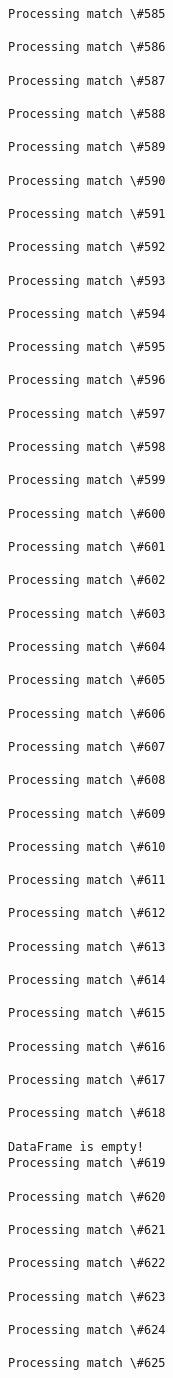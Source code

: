 \documentclass[11pt]{article}
\begin{document}
\begin{Verbatim}[commandchars=\\\{\}]
Processing match \#585

Processing match \#586

Processing match \#587

Processing match \#588

Processing match \#589

Processing match \#590

Processing match \#591

Processing match \#592

Processing match \#593

Processing match \#594

Processing match \#595

Processing match \#596

Processing match \#597

Processing match \#598

Processing match \#599

Processing match \#600

Processing match \#601

Processing match \#602

Processing match \#603

Processing match \#604

Processing match \#605

Processing match \#606

Processing match \#607

Processing match \#608

Processing match \#609

Processing match \#610

Processing match \#611

Processing match \#612

Processing match \#613

Processing match \#614

Processing match \#615

Processing match \#616

Processing match \#617

Processing match \#618

DataFrame is empty!
Processing match \#619

Processing match \#620

Processing match \#621

Processing match \#622

Processing match \#623

Processing match \#624

Processing match \#625


\end{Verbatim}
\end{document}
